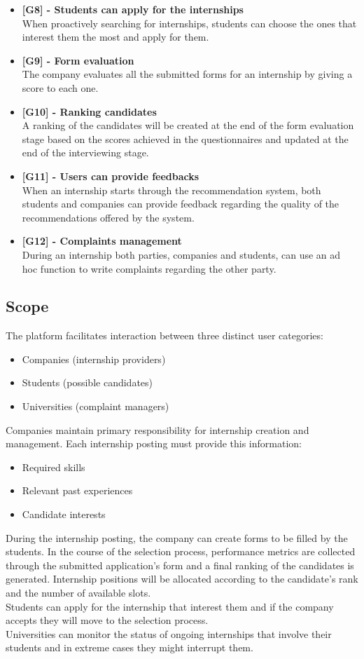 \documentclass[11pt,twoside]{article}
\begin{document}
\begin{itemize}
\item \textbf{[G8] - Students can apply for the internships} \\
When proactively searching for internships, students can choose the ones that interest them the most and apply for them.
\item \textbf{[G9] - Form evaluation} \\
The company evaluates all the submitted forms for an internship by giving a score to each one.
\item \textbf{[G10] - Ranking candidates} \\
A ranking of the candidates will be created at the end of the form evaluation stage based on the scores achieved in the questionnaires and updated at the end of the interviewing stage.
\item \textbf{[G11] - Users can provide feedbacks} \\
When an internship starts through the recommendation system, both students and companies can provide feedback regarding the quality of the recommendations offered by the system.
\item \textbf{[G12] - Complaints management} \\
During an internship both parties, companies and students, can use an ad hoc function to write complaints regarding the other party.
\end{itemize}

	\subsection{Scope}
	The platform facilitates interaction between three distinct user categories:
\begin{itemize}
	\item Companies (internship providers)
	\item Students (possible candidates)
	\item Universities (complaint managers)
\end{itemize}
Companies maintain primary responsibility for internship creation and management. Each internship posting must provide this information:
\begin{itemize}
	\item Required skills
	\item Relevant past experiences
	\item Candidate interests
\end{itemize}
During the internship posting, the company can create forms to be filled by the students. In the course of the selection process, performance metrics are collected through the submitted application's form and a final ranking of the candidates is generated. Internship positions will be allocated according to the candidate's rank and the number of available slots. \\
Students can apply for the internship that interest them and if the company accepts they will move to the selection process. \\
Universities can monitor the status of ongoing internships that involve their students and in extreme cases they might interrupt them.
\end{document}
